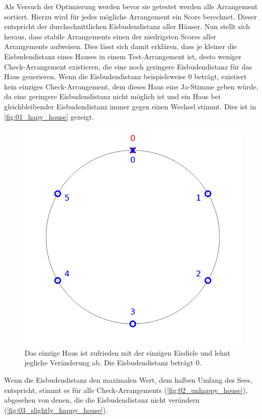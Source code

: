 \documentclass[a4paper,10pt,ngerman]{scrartcl}
\newcommand{\imageWidth}{0.3\linewidth}
\begin{document}
\medskip
Als Versuch der Optimierung werden bevor sie getestet werden alle Arrangement sortiert.
Hierzu wird für jedes mögliche Arrangement ein Score berechnet.
Dieser entspricht der durchschnittlichen Eisbudendistanz aller Häuser.
Nun stellt sich heraus, dass stabile Arrangements einen der niedrigsten Scores aller Arrangements aufweisen.
Dies lässt sich damit erklären, dass je kleiner die Eisbudendistanz eines Hauses in einem Test-Arrangement ist, desto weniger Check-Arrangement existieren, die eine noch geringere Eisbudendistanz für das Haus generieren.
Wenn die Eisbudendistanz beispielsweise $0$ beträgt, existiert kein einziges Check-Arrangement, dem dieses Haus eine Ja-Stimme geben würde, da eine geringere Eisbudendistanz nicht möglich ist und ein Haus bei gleichbleibender Eisbudendistanz immer gegen einen Wechsel stimmt.
Dies ist in \autoref{fig:01_hapy_house} gezeigt.
\begin{figure}[ht]
    \centering
    \includegraphics[width=\imageWidth]{01_happy_house.png}
    \caption{Das einzige Haus ist zufrieden mit der einzigen Eisdiele und lehnt jegliche Veränderung ab. Die Eisbudendistanz beträgt $0$.}
    \label{fig:01_hapy_house}
\end{figure}
Wenn die Eisbudendistanz den maximalen Wert, dem halben Umfang des Sees, entspricht, stimmt es für alle Check-Arrangements (\autoref{fig:02_unhappy_house}), abgesehen von denen, die die Eisbudendistanz nicht verändern (\autoref{fig:03_slightly_happy_house}).
\end{document}

